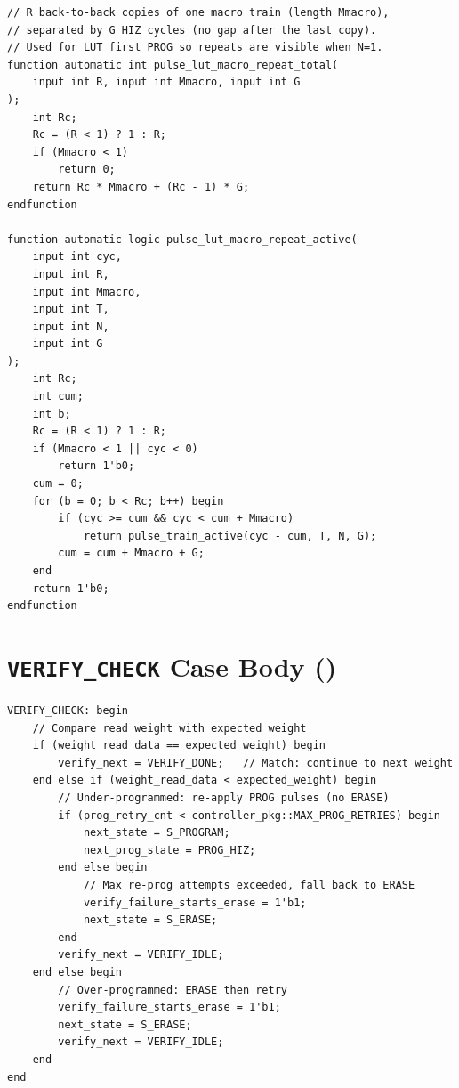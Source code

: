 \begin{lstlisting}[style=svstyle,
    caption={LUT-based macro-repeat helpers.},
    label={lst:pulse-lut}]
// R back-to-back copies of one macro train (length Mmacro),
// separated by G HIZ cycles (no gap after the last copy).
// Used for LUT first PROG so repeats are visible when N=1.
function automatic int pulse_lut_macro_repeat_total(
    input int R, input int Mmacro, input int G
);
    int Rc;
    Rc = (R < 1) ? 1 : R;
    if (Mmacro < 1)
        return 0;
    return Rc * Mmacro + (Rc - 1) * G;
endfunction

function automatic logic pulse_lut_macro_repeat_active(
    input int cyc,
    input int R,
    input int Mmacro,
    input int T,
    input int N,
    input int G
);
    int Rc;
    int cum;
    int b;
    Rc = (R < 1) ? 1 : R;
    if (Mmacro < 1 || cyc < 0)
        return 1'b0;
    cum = 0;
    for (b = 0; b < Rc; b++) begin
        if (cyc >= cum && cyc < cum + Mmacro)
            return pulse_train_active(cyc - cum, T, N, G);
        cum = cum + Mmacro + G;
    end
    return 1'b0;
endfunction
\end{lstlisting}

\section{\texttt{VERIFY\_CHECK} Case Body ()}
\label{app:listing-verify-check}

\begin{lstlisting}[style=svstyle,
    caption={\sv{VERIFY\_CHECK} branch of the combinational FSM block,
             from \sv{source/Controller/controller.sv}.},
    label={lst:verify-check}]
VERIFY_CHECK: begin
    // Compare read weight with expected weight
    if (weight_read_data == expected_weight) begin
        verify_next = VERIFY_DONE;   // Match: continue to next weight
    end else if (weight_read_data < expected_weight) begin
        // Under-programmed: re-apply PROG pulses (no ERASE)
        if (prog_retry_cnt < controller_pkg::MAX_PROG_RETRIES) begin
            next_state = S_PROGRAM;
            next_prog_state = PROG_HIZ;
        end else begin
            // Max re-prog attempts exceeded, fall back to ERASE
            verify_failure_starts_erase = 1'b1;
            next_state = S_ERASE;
        end
        verify_next = VERIFY_IDLE;
    end else begin
        // Over-programmed: ERASE then retry
        verify_failure_starts_erase = 1'b1;
        next_state = S_ERASE;
        verify_next = VERIFY_IDLE;
    end
end
\end{lstlisting}

